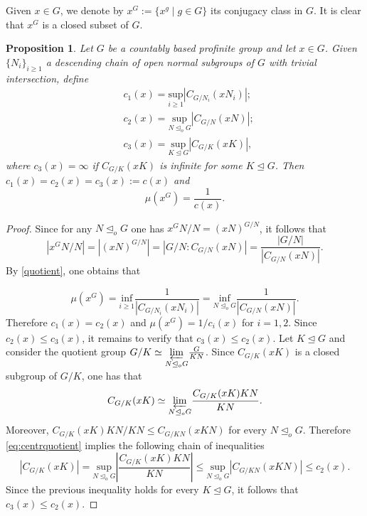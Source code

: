 \documentclass[a4paper,10pt]{amsart}
\theoremstyle{plain}
\newtheorem{proposition}[thm]{Proposition}
\theoremstyle{definition}
\numberwithin{equation}{section}
\begin{document}
	Given $x\in G$, we denote by $x^G:=\{x^g\mid g\in G\}$ its conjugacy class in $G$. It is clear that $x^G$ is a closed subset of $G$.
	\begin{proposition}\label{pr:ccmeasure}
		Let $G$ be a countably based profinite group and let $x\in G$. Given $\{N_i\}_{i\geq 1}$ a descending chain of open normal subgroups of $G$ with trivial intersection, define 
		\begin{align*}
			& c_1(x)=\underset{i\geq 1}{\mathrm{sup}}|C_{G/N_i}(xN_i)|;\\
			& c_2(x)=\underset{N\unlhd_oG}{\mathrm{sup}}|C_{G/N}(xN)|;\\
			& c_3(x)=\underset{K\unlhd G}{\mathrm{sup}}|C_{G/K}(xK)|,
		\end{align*}
		where $c_3(x)=\infty$ if $C_{G/K}(xK)$ is infinite for some $K\unlhd G$. Then $c_1(x)=c_2(x)=c_3(x):=c(x)$ and \begin{equation}\label{eq:ccmeasure}
			\mu(x^G)=\frac{1}{c(x)}.
		\end{equation}
	\end{proposition}
	\begin{proof}
		Since for any $N\unlhd_o G$ one has $x^GN/N=(xN)^{G/N}$, it follows that
		\begin{equation*}\label{eq:orbstab}
			|x^GN/N|=|(xN)^{G/N}|=|G/N:C_{G/N}(xN)|=\frac{|G/N|}{|C_{G/N}(xN)|}. 
		\end{equation*} 
		By \cref{quotient}, one obtains that 
        
		\begin{equation*}
			\mu(x^G)=\underset{i\geq 1}{\mathrm{inf}}\frac{1}{|C_{G/N_i}(xN_i)|}=\underset{N\unlhd_oG}{\mathrm{inf}}\frac{1}{|C_{G/N}(xN)|}. 
		\end{equation*} Therefore $c_1(x)=c_2(x)$ and $\mu(x^G)=1/c_i(x)$ for $i=1,2$. Since $c_2(x)\leq c_3(x)$, it remains to verify that $c_3(x)\leq c_2(x)$. Let $K\unlhd G$ and consider the quotient group $G/K\simeq \underset{N\unlhd_oG}\varprojlim\frac{G}{KN}$.
        Since $C_{G/K}(xK)$ is a closed subgroup of $G/K$, one has that 
		\begin{equation}\label{eq:centrquotient}
			C_{G/K}(xK)\simeq\underset{N\unlhd_oG}\varprojlim\frac{C_{G/K}(xK)KN}{KN}.
		\end{equation}
		Moreover, $C_{G/K}(xK)KN/KN\leq C_{G/KN}(xKN)$ for every $N\unlhd_oG$. Therefore \cref{eq:centrquotient} implies the following chain of inequalities 
		\begin{equation*}
			|C_{G/K}(xK)|=\underset{N\unlhd_oG}{\mathrm{sup}}\left\vert\frac{C_{G/K}(xK)KN}{KN}\right\vert\leq \underset{N\unlhd_oG}{\mathrm{sup}}|C_{G/KN}(xKN)|\leq c_2(x).
		\end{equation*}
		Since the previous inequality holds for every $K\unlhd G$, it follows that $c_3(x)\leq c_2(x)$.
	\end{proof}
\end{document}
